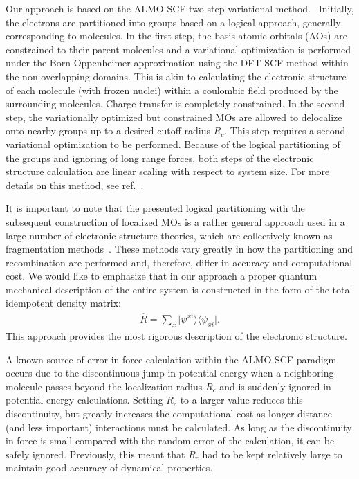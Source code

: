 \documentclass[aps,prl,reprint,amsmath,amssymb]{revtex4-1}
\begin{document}

Our approach is based on the ALMO SCF two-step variational method.~\cite{a:almo-ls} 
Initially, the electrons are partitioned into groups based on a logical approach, generally corresponding to molecules. 
In the first step, the basis atomic orbitals (AOs) are constrained to their parent molecules and a variational optimization is performed under the Born-Oppenheimer approximation using the DFT-SCF method within the non-overlapping domains. 
This is akin to calculating the electronic structure of each molecule (with frozen nuclei) within a coulombic field produced by the surrounding molecules. 
Charge transfer is completely constrained. 
In the second step, the variationally optimized but constrained MOs are allowed to delocalize onto nearby groups up to a desired cutoff radius $R_{c}$. 
This step requires a second variational optimization to be performed. 
Because of the logical partitioning of the groups and ignoring of long range forces, both steps of the electronic structure calculation are linear scaling with respect to system size. 
For more details on this method, see ref.\ .

It is important to note that the presented logical partitioning with the subsequent construction of localized MOs is a rather general approach used in a large number of electronic structure theories, which are collectively known as fragmentation methods~\cite{a:fragmentation-rev}. These methods vary greatly in how the partitioning and recombination are performed and, therefore, differ in accuracy and computational cost. We would like to emphasize that in our approach a proper quantum mechanical description of the entire system is constructed in the form of the total idempotent density matrix:
%
\begin{eqnarray}
\label{eq:properdm}
\hat{R} = \sum_{x} \vert \psi^{xi} \rangle \langle \psi_{xi}\vert.
\end{eqnarray}
%
This approach provides the most rigorous description of the electronic structure.

A known source of error in force calculation within the ALMO SCF paradigm occurs due to the discontinuous jump in potential energy when a neighboring molecule passes beyond the localization radius $R_{c}$ and is suddenly ignored in potential energy calculations. 
Setting $R_{c}$ to a larger value reduces this discontinuity, but greatly increases the computational cost as longer distance (and less important) interactions must be calculated. 
As long as the discontinuity in force is small compared with the random error of the calculation, it can be safely ignored. Previously, this meant that $R_{c}$ had to be kept relatively large to maintain good accuracy of dynamical properties.
\end{document}
